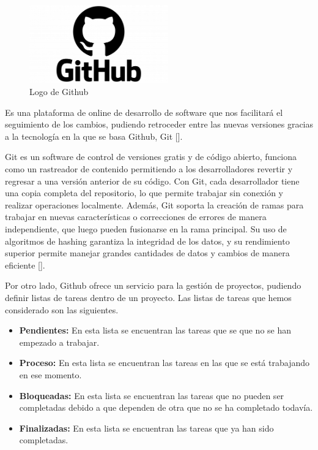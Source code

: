 \begin{figure}[H]
    \centering
    \includegraphics[width=6cm]{archivos/tfg_jorge/logos/github}
    \caption{Logo de Github}\label{sistemass2}
\end{figure}

Es una plataforma de online de desarrollo de software que nos facilitará el seguimiento de los cambios, pudiendo retroceder entre las nuevas versiones gracias a la tecnología en la que se basa Github, Git [\cite{def_github}].

Git es un software de control de versiones gratis y de código abierto, funciona como un rastreador de contenido permitiendo a los desarrolladores revertir y regresar a una versión anterior de su código. Con Git, cada desarrollador tiene una copia completa del repositorio, lo que permite trabajar sin conexión y realizar operaciones localmente. Además, Git soporta la creación de ramas para trabajar en nuevas características o correcciones de errores de manera independiente, que luego pueden fusionarse en la rama principal. Su uso de algoritmos de hashing garantiza la integridad de los datos, y su rendimiento superior permite manejar grandes cantidades de datos y cambios de manera eficiente [\cite{def_git}].

Por otro lado, Github ofrece un servicio para la gestión de proyectos, pudiendo definir listas de tareas dentro de un proyecto. Las listas de tareas que hemos considerado son las siguientes.

\begin{itemize}
	\item \textbf{Pendientes:} En esta lista se encuentran las tareas que se que no se han empezado a trabajar.
	\item \textbf{Proceso:} En esta lista se encuentran las tareas en las que se está trabajando en ese momento.
	\item \textbf{Bloqueadas:} En esta lista se encuentran las tareas que no pueden ser completadas debido a que dependen de otra que no se ha completado todavía.
	\item \textbf{Finalizadas:} En esta lista se encuentran las tareas que ya han sido completadas.
\end{itemize}

